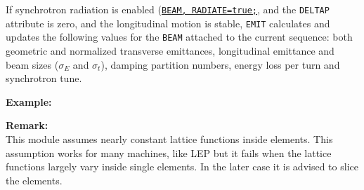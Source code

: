 If synchrotron radiation is enabled (\hyperref[sec:beam]{\texttt{BEAM, RADIATE=true;}}, 
and the \texttt{DELTAP} attribute is zero, and the longitudinal motion is stable, 
\texttt{EMIT} calculates and updates the following values for the \texttt{BEAM} attached 
to the current sequence: both geometric and normalized transverse emittances, 
longitudinal emittance and beam sizes ($\sigma_E$ and $\sigma_t$), 
damping partition numbers, energy loss per turn and synchrotron tune.


\textbf{Example:}

\textbf{Remark:}\\
This module assumes nearly constant lattice functions
inside elements. This assumption works for many machines, like LEP
but it fails when the lattice functions largely vary inside single
elements. In the later case it is advised to slice the elements.


